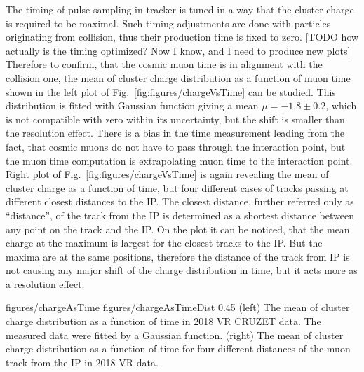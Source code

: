 The timing of pulse sampling in tracker is tuned in a way that the cluster charge is required to be maximal. Such timing adjustments are done with particles originating from collision, thus their production time is fixed to zero. [TODO how actually is the timing optimized? Now I know, and I need to produce new plots] Therefore to confirm, that the cosmic muon time is in alignment with the collision one, the mean of cluster charge distribution as a function of muon time shown in the left plot of Fig.~\ref{fig:figures/chargeVsTime} can be studied. This distribution is fitted with Gaussian function giving a mean $\mu = -1.8 \pm 0.2$, which is not compatible with zero within its uncertainty, but the shift is smaller than the resolution effect. There is a bias in the time measurement leading from the fact, that cosmic muons do not have to pass through the interaction point, but the muon time computation is extrapolating muon time to the interaction point. Right plot of Fig.~\ref{fig:figures/chargeVsTime} is again revealing the mean of cluster charge as a function of time, but four different cases of tracks passing at different closest distances to the IP. The closest distance, further referred only as ``distance'', of the track from the IP  is determined as a shortest distance between any point on the track and the IP. On the plot it can be noticed, that the mean charge at the maximum is largest for the closest tracks to the IP. But the maxima are at the same positions, therefore the distance of the track from IP is not causing any major shift of the charge distribution in time, but it acts more as a resolution effect. 


                 {figures/chargeAsTime}
                 {figures/chargeAsTimeDist} %
                 {0.45}       %
                 {(left) The mean of cluster charge distribution as a function of time in 2018 VR CRUZET data. The measured data were fitted by a Gaussian function. (right) The mean of cluster charge distribution as a function of time for four different distances of the muon track from the IP in 2018 VR data. }

